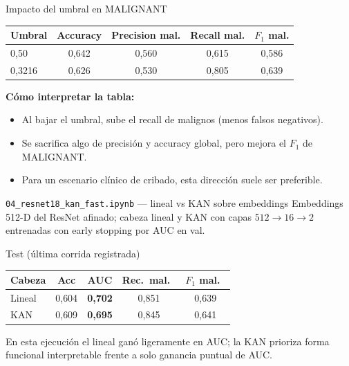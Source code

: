 \documentclass[aspectratio=169,spanish]{beamer}
\begin{document}
\begin{frame}{Impacto del umbral en MALIGNANT}
  \small
  \begin{tabular}{@{}lcccc@{}}
    \toprule
    Umbral & Accuracy & Precision mal. & Recall mal. & $F_1$ mal. \\
    \midrule
    0{,}50   & 0{,}642 & 0{,}560 & 0{,}615 & 0{,}586 \\
    0{,}3216 & 0{,}626 & 0{,}530 & 0{,}805 & 0{,}639 \\
    \bottomrule
  \end{tabular}

  \vspace{0.7em}
  \textbf{Cómo interpretar la tabla:}
  \begin{itemize}
    \item Al bajar el umbral, sube el recall de malignos (menos falsos negativos).
    \item Se sacrifica algo de precisión y accuracy global, pero mejora el $F_1$ de MALIGNANT.
    \item Para un escenario clínico de cribado, esta dirección suele ser preferible.
  \end{itemize}
\end{frame}

\begin{frame}{\texttt{04\_resnet18\_kan\_fast.ipynb} — lineal vs KAN sobre embeddings}
  Embeddings 512-D del ResNet afinado; cabeza lineal y KAN con capas $512\to16\to2$ entrenadas con early stopping por AUC en val.
  \begin{block}{Test (última corrida registrada)}
    \centering
    \small
    \begin{tabular}{@{}lcccc@{}}
      \toprule
      Cabeza & Acc & AUC & Rec.\ mal.\ & $F_1$ mal.\ \\
      \midrule
      Lineal & 0{,}604 & \textbf{0{,}702} & 0{,}851 & 0{,}639 \\
      KAN    & 0{,}609 & \textbf{0{,}695} & 0{,}845 & 0{,}641 \\
      \bottomrule
    \end{tabular}
  \end{block}
  En esta ejecución el lineal ganó ligeramente en AUC; la KAN prioriza forma funcional interpretable frente a solo ganancia puntual de AUC.
\end{frame}
\end{document}
